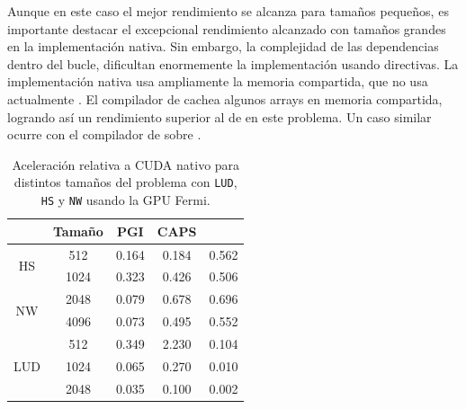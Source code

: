 Aunque en este caso el mejor rendimiento se alcanza para tamaños pequeños, es importante
destacar el excepcional rendimiento alcanzado con tamaños grandes en la implementación
nativa. Sin embargo, la complejidad de las dependencias dentro del bucle, dificultan 
enormemente la implementación usando directivas.
La implementación nativa usa ampliamente la memoria compartida, que no usa actualmente 
\accULL{}. El compilador de \PGI{} cachea algunos arrays en memoria compartida, logrando 
así un rendimiento superior al de \accULL{} en este problema. Un caso similar ocurre con el 
compilador de \CAPS{} sobre \OpenACC{}.

\begin{table}[htb]
\caption{Aceleración relativa a CUDA nativo %
		para distintos tamaños del problema con 
         \texttt{LUD}, \texttt{HS} y \texttt{NW} usando la GPU Fermi.}
\label{table:rodinia:fermi}
\newcommand{\m}{\hphantom{$-$}}
\renewcommand{\tabcolsep}{4pt} %
\renewcommand{\arraystretch}{1.2} %
\centering
\begin{tabular}{@{}ccccc}
\hline 
       & Tamaño & PGI & CAPS    & \accULL{} \\
\hline
\multirow{2}{*}{HS}  
      &   512  &  0.164      &  0.184  &  0.562    \\
      &  1024  &  0.323      &  0.426  &  0.506    \\
\hline
\multirow{2}{*}{NW}  
      &  2048  &  0.079      &  0.678  &  0.696    \\ 
      &  4096  &  0.073      &  0.495  &  0.552    \\
\hline
\multirow{3}{*}{LUD}  
      &   512  &  0.349      &  2.230  &  0.104    \\
      &  1024  &  0.065      &  0.270  &  0.010    \\
      &  2048  &  0.035      &  0.100  &  0.002    \\
\hline
\end{tabular}\\[2pt]
\end{table}

